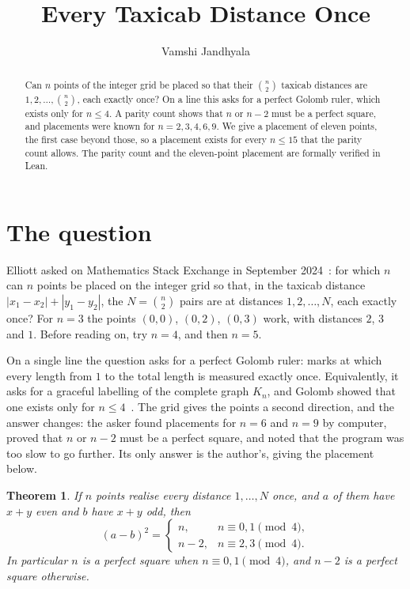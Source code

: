 \documentclass[11pt]{amsart}
\title{Every Taxicab Distance Once}
\author{Vamshi Jandhyala}
\newtheorem{theorem}{Theorem}
\theoremstyle{remark}
\begin{document}
\begin{abstract}
Can $n$ points of the integer grid be placed so that their $\binom n2$ taxicab distances are $1,2,\dots,\binom n2$, each exactly once? On a line this asks for a perfect Golomb ruler, which exists only for $n\le4$. A parity count shows that $n$ or $n-2$ must be a perfect square, and placements were known for $n=2,3,4,6,9$. We give a placement of eleven points, the first case beyond those, so a placement exists for every $n\le15$ that the parity count allows. The parity count and the eleven-point placement are formally verified in Lean.
\end{abstract}

\maketitle

\section{The question}

Elliott asked on Mathematics Stack Exchange in September 2024~\cite{MSE}: for which $n$ can $n$ points be placed on the integer grid so that, in the taxicab distance $|x_1-x_2|+|y_1-y_2|$, the $N=\binom n2$ pairs are at distances $1,2,\dots,N$, each exactly once? For $n=3$ the points $(0,0)$, $(0,2)$, $(0,3)$ work, with distances $2$, $3$ and $1$. Before reading on, try $n=4$, and then $n=5$.

On a single line the question asks for a perfect Golomb ruler: marks at which every length from $1$ to the total length is measured exactly once. Equivalently, it asks for a graceful labelling of the complete graph $K_n$, and Golomb showed that one exists only for $n\le4$~\cite{Golomb}. The grid gives the points a second direction, and the answer changes: the asker found placements for $n=6$ and $n=9$ by computer, proved that $n$ or $n-2$ must be a perfect square, and noted that the program was too slow to go further. Its only answer is the author's, giving the placement below.

\begin{theorem}\label{thm:par}
If $n$ points realise every distance $1,\dots,N$ once, and $a$ of them have $x+y$ even and $b$ have $x+y$ odd, then
\[
(a-b)^2=\begin{cases} n, & n\equiv0,1\pmod 4,\\ n-2, & n\equiv2,3\pmod 4.\end{cases}
\]
In particular $n$ is a perfect square when $n\equiv0,1\pmod4$, and $n-2$ is a perfect square otherwise.
\end{theorem}
\end{document}
